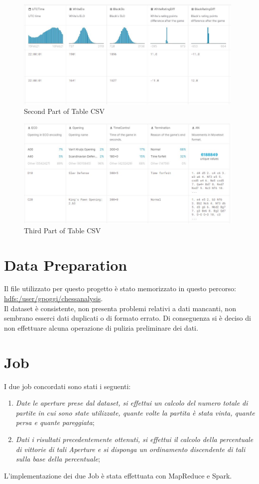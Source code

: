 \documentclass[10pt]{article}
\begin{document}
\begin{figure}[htp]
    \centering
    \includegraphics[width=11cm]{images/z2.JPG}
    \caption{Second Part of Table CSV}
\end{figure}
\begin{figure}[htp]
    \centering
    \includegraphics[width=11cm]{images/z3.JPG}
    \caption{Third Part of Table CSV}
\end{figure}

\section{Data Preparation}

Il file utilizzato per questo progetto è stato memorizzato in questo percorso:
\url{hdfs:/user/gpoggi/chessanalysis}.\\Il dataset \`e consistente, non presenta problemi relativi a dati mancanti, non sembrano esserci dati duplicati o di formato errato. Di conseguenza si \`e deciso di non effettuare alcuna operazione di pulizia preliminare dei dati.

\section{Job}

I due job concordati sono stati i seguenti:
\begin{enumerate}
    \item \textit{Date le aperture prese dal dataset, si effettui un calcolo del numero totale di partite in cui sono state utilizzate, quante volte la partita \`e stata vinta, quante persa e quante pareggiata};
    \item \textit{Dati i risultati precedentemente ottenuti, si effettui il calcolo della percentuale di vittorie di tali Aperture e si disponga un ordinamento discendente di tali sulla base della percentuale};
\end{enumerate}
L'implementazione dei due Job \`e stata effettuata con MapReduce e Spark.
\end{document}
